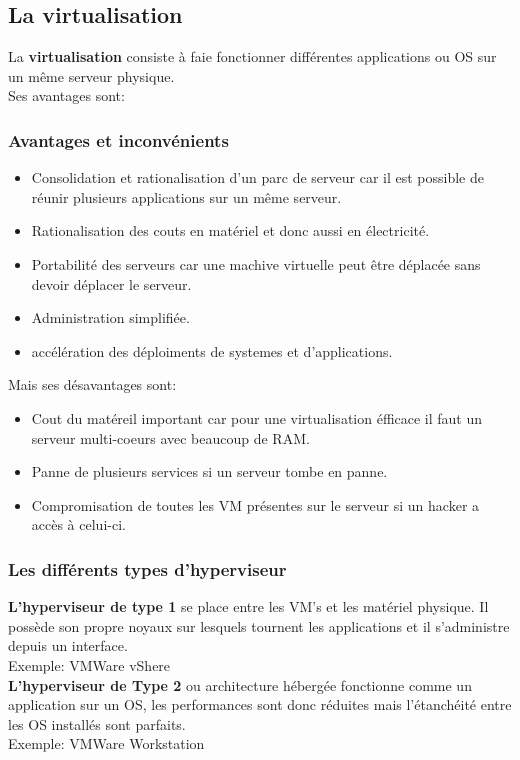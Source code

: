 \documentclass[10pt,a4paper]{article}
\begin{document}
 \subsection{La virtualisation}
 La \textbf{virtualisation} consiste à faie fonctionner différentes applications ou OS sur un même serveur physique.\\
 Ses avantages sont:
 \subsubsection{Avantages et inconvénients}
 \begin{itemize}
	 \item Consolidation et rationalisation d'un parc de serveur car il est possible de réunir plusieurs applications sur un même serveur.
	 \item Rationalisation des couts en matériel et donc aussi en électricité.
	 \item Portabilité des serveurs car une machive virtuelle peut être déplacée sans devoir déplacer le serveur.
	 \item Administration simplifiée.
	 \item accélération des déploiments de systemes et d'applications.
 \end{itemize}
 Mais ses désavantages sont:
 \begin{itemize}
	 \item Cout du matéreil important car pour une virtualisation éfficace il faut un serveur multi-coeurs avec beaucoup de RAM\@.
	 \item Panne de plusieurs services si un serveur tombe en panne.
	 \item Compromisation de toutes les VM présentes sur le serveur si un hacker a accès à celui-ci.
 \end{itemize}
 \subsubsection{Les différents types d'hyperviseur}

 \textbf{L'hyperviseur de type 1} se place entre les VM's et les matériel physique. Il possède son propre noyaux sur lesquels tournent les applications et il s'administre depuis un interface.\\
 Exemple: VMWare vShere\\

 \indent
 \textbf{L'hyperviseur de Type 2} ou architecture hébergée fonctionne comme un application sur un OS, les performances sont donc réduites mais l'étanchéité entre les OS installés sont parfaits.\\
 Exemple: VMWare Workstation\\
\end{document}
